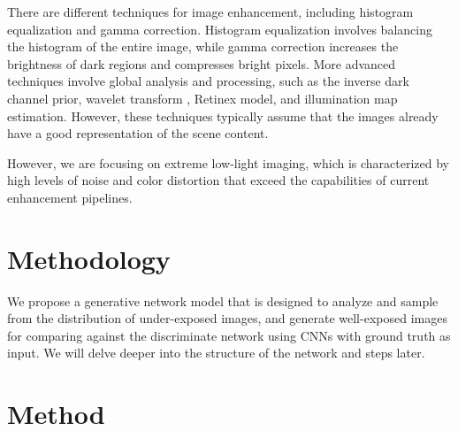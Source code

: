 \documentclass{article}
\begin{document}
There are different techniques for image enhancement, including histogram equalization and gamma correction. Histogram equalization involves balancing the histogram of the entire image, while gamma correction increases the brightness of dark regions and compresses bright pixels. More advanced techniques involve global analysis and processing, such as the inverse dark channel prior, wavelet transform \cite{AutomaticContrastEnhancement}, Retinex model\cite{retinex}, and illumination map estimation\cite{illumest}. However, these techniques typically assume that the images already have a good representation of the scene content.

However, we are focusing on extreme low-light imaging, which is characterized by high levels of noise and color distortion that exceed the capabilities of current enhancement pipelines.

\section{Methodology}
We propose a generative network model that is designed to analyze and sample from the distribution of under-exposed images, and generate well-exposed images for comparing against the discriminate network using CNNs with ground truth as input. We will delve deeper into the structure of the network and steps later.

\section{Method}
\end{document}
